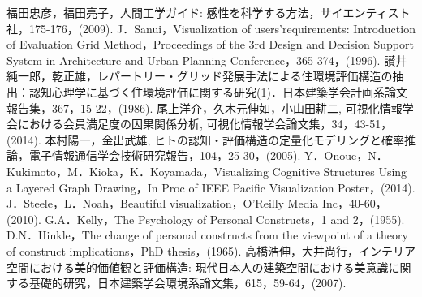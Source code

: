 \documentclass[syuuron]{kuee}
\begin{document}


\begin{thebibliography}{数字}
	 福田忠彦，福田亮子，人間工学ガイド: 感性を科学する方法，サイエンティスト社，175-176，(2009).
	 J．Sanui，Visualization of users’requirements: Introduction of Evaluation Grid Method，Proceedings of the 3rd Design and Decision Support System in Architecture and Urban Planning Conference，365-374，(1996).
	 讃井純一郎，乾正雄，レパートリー・グリッド発展手法による住環境評価構造の抽出：認知心理学に基づく住環境評価に関する研究(1)．日本建築学会計画系論文報告集，367，15-22，(1986).
	 尾上洋介，久木元伸如，小山田耕二, 可視化情報学会における会員満足度の因果関係分析, 可視化情報学会論文集，34，43-51，(2014).
	 本村陽一，金出武雄, ヒトの認知・評価構造の定量化モデリングと確率推論，電子情報通信学会技術研究報告，104，25-30，(2005).
	 Y．Onoue，N．Kukimoto，M．Kioka，K．Koyamada，Visualizing Cognitive Structures Using a Layered Graph Drawing，In Proc of IEEE Pacific Visualization Poster，(2014).
	 J．Steele，L．Noah，Beautiful visualization，O'Reilly Media Inc，40-60，(2010).
	 G.A．Kelly，The Psychology of Personal Constructs，1 and 2，(1955).
	 D.N．Hinkle，The change of personal constructs from the viewpoint of a theory of construct implications，PhD thesis，(1965).
	 高橋浩伸，大井尚行，インテリア空間における美的価値観と評価構造: 現代日本人の建築空間における美意識に関する基礎的研究，日本建築学会環境系論文集，615，59-64，(2007).
	

\end{thebibliography}
\end{document}
